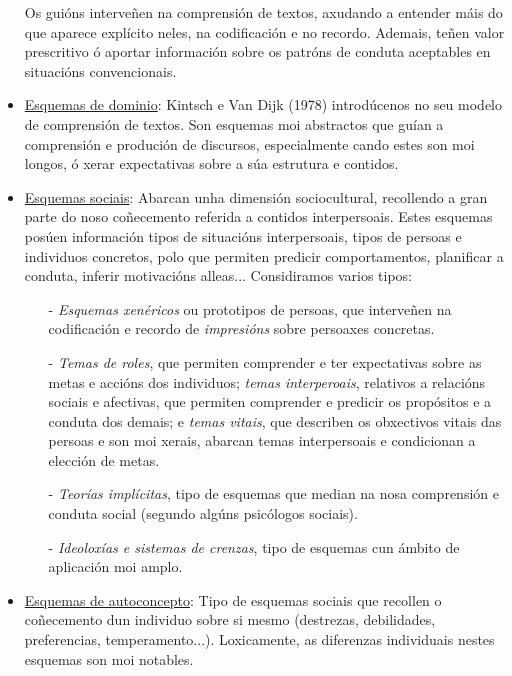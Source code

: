\documentclass[a4paper,11pt]{article}
\begin{document}
\begin{itemize}
	Os guións interveñen na comprensión de textos, axudando a entender máis do que aparece explícito 
	neles, na codificación e no recordo. Ademais, teñen valor prescritivo ó aportar información 
	sobre os patróns de conduta aceptables en situacións convencionais.
	\item \underline{Esquemas de dominio}: Kintsch e Van Dijk (1978) introdúcenos no seu modelo de 
	comprensión de textos. Son esquemas moi abstractos que guían a comprensión e produción de 
	discursos, especialmente cando estes son moi longos, ó xerar expectativas sobre a súa estrutura 
	e contidos.
	\item \underline{Esquemas sociais}: Abarcan unha dimensión sociocultural, recollendo a gran 
	parte do noso coñecemento referida a contidos interpersoais. Estes esquemas posúen información
	tipos de situacións interpersoais, tipos de persoas e individuos concretos, polo que permiten 
	predicir comportamentos, planificar a conduta, inferir motivacións alleas... Considiramos varios 
	tipos:
	\begin{itemize}
		\item[-] \textit{Esquemas xenéricos} ou prototipos de persoas, que interveñen na 
		codificación e recordo de \textit{impresións} sobre persoaxes concretas.
		\item[-] \textit{Temas de roles}, que permiten comprender e ter expectativas sobre as metas 
		e accións dos individuos; \textit{temas interperoais}, relativos a relacións sociais e 
		afectivas, que permiten comprender e predicir os propósitos e a conduta dos demais; e 
		\textit{temas vitais}, que describen os obxectivos vitais das persoas e son moi xerais, 
		abarcan temas interpersoais e condicionan a elección de metas.
		\item[-] \textit{Teorías implícitas}, tipo de esquemas que median na nosa comprensión e 
		conduta social (segundo algúns psicólogos sociais).
		\item[-] \textit{Ideoloxías e sistemas de crenzas}, tipo de esquemas cun ámbito de 
		aplicación moi amplo.
	\end{itemize}	
	\item \underline{Esquemas de autoconcepto}: Tipo de esquemas sociais que recollen o coñecemento 
	dun individuo sobre si mesmo (destrezas, debilidades, preferencias, temperamento...). 
	Loxicamente, as diferenzas individuais nestes esquemas son moi notables. 
	

\end{itemize}
\end{document}
